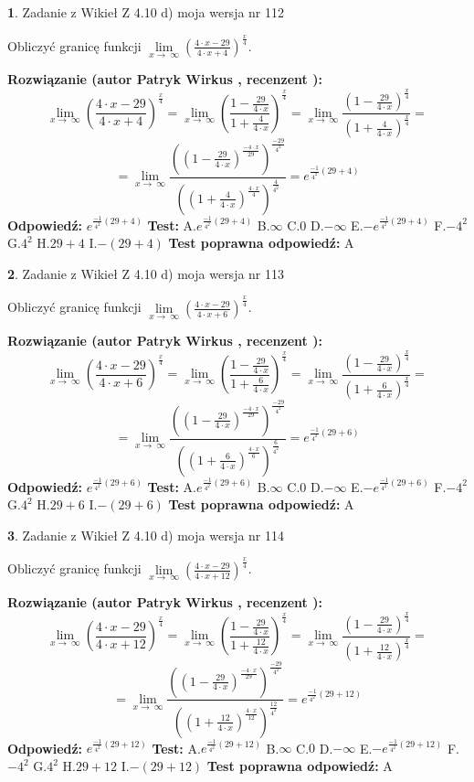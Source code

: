 \documentclass[12pt, a4paper]{article}
\theoremstyle{definition} %
\newtheorem{zad}{}
\newcommand{\zadStart}[1]{\begin{zad}#1\newline}
\newcommand{\zadStop}{\end{zad}}
\newcommand{\rozwStart}[2]{\noindent \textbf{Rozwiązanie (autor #1 , recenzent #2): }\newline}
\newcommand{\rozwStop}{\newline}
\newcommand{\odpStart}{\noindent \textbf{Odpowiedź:}\newline}
\newcommand{\odpStop}{\newline}
\newcommand{\testStart}{\noindent \textbf{Test:}\newline}
\newcommand{\testStop}{\newline}
\newcommand{\kluczStart}{\noindent \textbf{Test poprawna odpowiedź:}\newline}
\newcommand{\kluczStop}{\newline}
\begin{document}
\zadStart{Zadanie z Wikieł Z 4.10 d) moja wersja nr 112}


Obliczyć granicę funkcji  $\lim\limits_{x\to\ \infty}(\frac{4\cdot x-29}{4\cdot x+4})^{\frac{x}{4}}$.
\zadStop
\rozwStart{Patryk Wirkus}{}
$$\lim\limits_{x\to\ \infty}(\frac{4\cdot x-29}{4\cdot x+4})^{\frac{x}{4}} = \lim\limits_{x\to\ \infty}(\frac{1-\frac{29}{4\cdot x}}{1+\frac{4}{4\cdot x}})^{\frac{x}{4}}=\lim\limits_{x\to\ \infty}\frac{(1-\frac{29}{4\cdot x})^{\frac{x}{4}}}{(1+\frac{4}{4\cdot x})^{\frac{x}{4}}}=$$
$$=\lim\limits_{x\to\ \infty}\frac{((1-\frac{29}{4\cdot x})^{\frac{-4\cdot x}{29}})^{\frac{-29}{4^{2}}}}{((1+\frac{4}{4\cdot x})^{\frac{4\cdot x}{4}})^{\frac{4}{4^{2}}}}=e^{\frac{-1}{4^{2}}(29+4)}$$
\rozwStop
\odpStart
$e^{\frac{-1}{4^{2}}(29+4)}$
\odpStop
\testStart
A.$e^{\frac{-1}{4^{2}}(29+4)}$ B.$\infty$ C.$0$ D.$-\infty$ E.$-e^{\frac{-1}{4^{2}}(29+4)}$
F.$-4^{2}$ G.$4^{2}$
H.$29+4$
I.$-(29+4)$
\testStop
\kluczStart
A
\kluczStop



\zadStart{Zadanie z Wikieł Z 4.10 d) moja wersja nr 113}


Obliczyć granicę funkcji  $\lim\limits_{x\to\ \infty}(\frac{4\cdot x-29}{4\cdot x+6})^{\frac{x}{4}}$.
\zadStop
\rozwStart{Patryk Wirkus}{}
$$\lim\limits_{x\to\ \infty}(\frac{4\cdot x-29}{4\cdot x+6})^{\frac{x}{4}} = \lim\limits_{x\to\ \infty}(\frac{1-\frac{29}{4\cdot x}}{1+\frac{6}{4\cdot x}})^{\frac{x}{4}}=\lim\limits_{x\to\ \infty}\frac{(1-\frac{29}{4\cdot x})^{\frac{x}{4}}}{(1+\frac{6}{4\cdot x})^{\frac{x}{4}}}=$$
$$=\lim\limits_{x\to\ \infty}\frac{((1-\frac{29}{4\cdot x})^{\frac{-4\cdot x}{29}})^{\frac{-29}{4^{2}}}}{((1+\frac{6}{4\cdot x})^{\frac{4\cdot x}{6}})^{\frac{6}{4^{2}}}}=e^{\frac{-1}{4^{2}}(29+6)}$$
\rozwStop
\odpStart
$e^{\frac{-1}{4^{2}}(29+6)}$
\odpStop
\testStart
A.$e^{\frac{-1}{4^{2}}(29+6)}$ B.$\infty$ C.$0$ D.$-\infty$ E.$-e^{\frac{-1}{4^{2}}(29+6)}$
F.$-4^{2}$ G.$4^{2}$
H.$29+6$
I.$-(29+6)$
\testStop
\kluczStart
A
\kluczStop



\zadStart{Zadanie z Wikieł Z 4.10 d) moja wersja nr 114}


Obliczyć granicę funkcji  $\lim\limits_{x\to\ \infty}(\frac{4\cdot x-29}{4\cdot x+12})^{\frac{x}{4}}$.
\zadStop
\rozwStart{Patryk Wirkus}{}
$$\lim\limits_{x\to\ \infty}(\frac{4\cdot x-29}{4\cdot x+12})^{\frac{x}{4}} = \lim\limits_{x\to\ \infty}(\frac{1-\frac{29}{4\cdot x}}{1+\frac{12}{4\cdot x}})^{\frac{x}{4}}=\lim\limits_{x\to\ \infty}\frac{(1-\frac{29}{4\cdot x})^{\frac{x}{4}}}{(1+\frac{12}{4\cdot x})^{\frac{x}{4}}}=$$
$$=\lim\limits_{x\to\ \infty}\frac{((1-\frac{29}{4\cdot x})^{\frac{-4\cdot x}{29}})^{\frac{-29}{4^{2}}}}{((1+\frac{12}{4\cdot x})^{\frac{4\cdot x}{12}})^{\frac{12}{4^{2}}}}=e^{\frac{-1}{4^{2}}(29+12)}$$
\rozwStop
\odpStart
$e^{\frac{-1}{4^{2}}(29+12)}$
\odpStop
\testStart
A.$e^{\frac{-1}{4^{2}}(29+12)}$ B.$\infty$ C.$0$ D.$-\infty$ E.$-e^{\frac{-1}{4^{2}}(29+12)}$
F.$-4^{2}$ G.$4^{2}$
H.$29+12$
I.$-(29+12)$
\testStop
\kluczStart
A
\kluczStop
\end{document}
